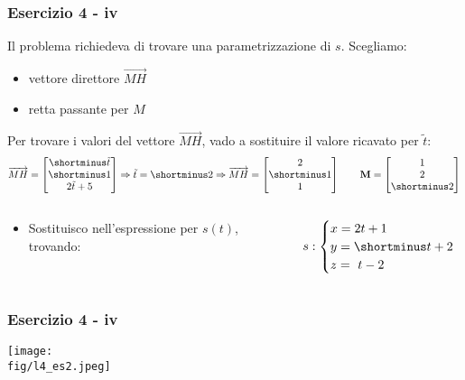 \documentclass{beamer}
\newcommand{\fig}{./figures} %
\begin{document}
\begin{frame}
\frametitle{Esercizio 4 - iv}
Il problema richiedeva di trovare una parametrizzazione di $s$. Scegliamo:
\begin{itemize}
        \item vettore direttore $\overrightarrow{MH}$
        \item retta passante per $M$
\end{itemize}

Per trovare i valori del vettore $\overrightarrow{MH}$, vado a sostituire il valore ricavato
per $\tilde t$:
$$
\overrightarrow{MH}
    =
    \begin{bmatrix}\shortminus \tilde t \\ \shortminus 1 \\ 2 \tilde t+5 \end{bmatrix}
\Rightarrow
\tilde t = \shortminus 2
\Rightarrow
\overrightarrow{MH}
    =
    \begin{bmatrix}2 \\ \shortminus 1 \\ 1\end{bmatrix}
        \qquad
    \mathbf M
    =
    \begin{bmatrix}1 \\ 2 \\ \shortminus 2 \end{bmatrix}
$$
\begin{columns}
\begin{column}{0.48\textwidth}
\begin{itemize}
\item Sostituisco nell'espressione per $s(t)$, trovando:
\end{itemize}
\end{column}
\begin{column}{0.48\textwidth}
\begin{displaymath}
s:
\begin{cases}
x  = 2t + 1 \\
y  = \shortminus t  + 2 \\
z  = \ t  - 2
\end{cases}
\end{displaymath}
\end{column}
\end{columns}
\end{frame}
%

\begin{frame}
\frametitle{Esercizio 4 - iv}
\begin{center}
\texttt{[image: \\fig/l4\_es2.jpeg]}
\end{center}
\end{frame}
%
\end{document}
